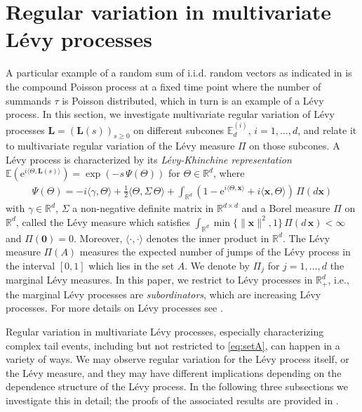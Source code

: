 \documentclass[aos]{imsart}
\numberwithin{equation}{section}
\theoremstyle{plain} %
\theoremstyle{remark}
\newcommand{\beao}{\begin{eqnarray*}}
\newcommand{\eeao}{\end{eqnarray*}\noindent}
\newcommand{\E}{\mathbb{E}}
\newcommand{\R}{\mathbb{R}}
\def\e{\text{e}}
\def\bzero{\boldsymbol 0}
\def\bL{\boldsymbol L}
\def\bx{\boldsymbol x}
\begin{document}
\section{Regular variation in multivariate L\'evy processes}\label{section:Levy}
A particular example of a random sum of i.i.d. random vectors as indicated in  is the compound Poisson process {at a fixed time point} where the number of summands $\tau$
is Poisson distributed, which in turn is an example of a L\'evy process.  In this section, we investigate multivariate regular variation
of  L\'evy processes $\bL=(\bL(s))_{s\geq 0}$ on different subcones $\E_d^{(i)}$, $i=1,\ldots,d$, and relate it to multivariate regular variation of the L\'evy measure $\Pi$  on those subcones.
 A  L{\'e}vy process   is
characterized by its {\em L{\'e}vy-Khinchine representation}
$\E(\e^{i\langle\Theta,\bL(s)\rangle})=\exp(-s\,\Psi(\Theta))$
for $\Theta\in\mathbb{R}^d$, where
 \beao
        \Psi(\Theta)=
        -i\langle \gamma,\Theta\rangle
        +\frac{1}{2}\langle\Theta,\Sigma\,\Theta \rangle+\int_{\R^d}
 \left(1-\e^{i\langle\Theta,\bx\rangle}+i\langle \bx,\Theta\rangle\right)\,\Pi(d\bx)
    \eeao
with  $\gamma\in\mathbb{R}^d$, $\Sigma$ a non-negative definite
matrix in $\mathbb{R}^{d\times d}$ and a Borel measure
 $\Pi$   on $\mathbb{R}^d$, called the L\'evy measure
 which satisfies
$\int_{\R^d}\min\{\|\bx\|^2,1\}\,\Pi(d\,\bx)<\infty$
and  $\Pi(\bzero)=0$. Moreover, $\langle
\cdot,\cdot\rangle$ denotes the inner product in $\R^d$.
The L\'evy measure $\Pi(A)$ measures the expected number of jumps of the L\'evy process in the interval $[0,1]$ which lies in the set $A$. We denote by $\Pi_j$ for $j=1,\ldots,d$ the marginal L\'evy measures. 
In this paper, we restrict to L\'evy processes in $\R_+^d$, i.e., the marginal L\'evy processes are \emph{subordinators}, which are increasing L\'evy processes. For more details on L\'evy processes see \cite{sato:1991,applebaum:2004}.


Regular variation in multivariate L\'evy processes, especially characterizing complex tail events, including but not restricted to \eqref{eq:setA},  can happen in a variety of ways. We may observe regular variation for the L\'evy process itself, or the L\'evy measure, and they may have different implications depending on the dependence structure of the L\'evy process. In the following three subsections we investigate this in detail; the proofs of the associated results are provided in  . 
\end{document}
